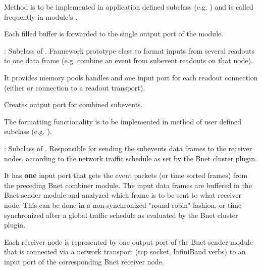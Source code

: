 \begin{description}
\begin{compactenum}
  \item Method  is to be implemented in application 
      defined subclass (e.g. ) and is called frequently 
      in module's . 
  \item Each filled buffer is forwarded to the single output port of the module. 
\end{compactenum}
\item[\class{bnet::CombinerModule}] :  
   Subclass of . 
   Framework prototype class to format inputs from several readouts to one data 
   frame (e.g. combine an event from subevent readouts on that node). 
\begin{compactenum}
  \item It provides memory pools handles and one input port for each 
      readout connection \\
      (either  or connection to a 
      readout transport). 
  \item Creates output port for combined subevents.    
  \item The formatting functionality is to be implemented in method 
       of user defined subclass (e.g. ).
\end{compactenum}
\item[\class{bnet::SenderModule}] : 
Subclass of . 
   Responsible for sending the subevents data frames to the receiver 
   nodes, according to the network traffic schedule as set by the Bnet cluster plugin.
\begin{compactenum}
  \item It has {\bf one} input port that gets the event packets 
      (or time sorted frames) from the preceding Bnet combiner module. 
      The input data frames are buffered in the Bnet sender module and analyzed 
      which frame is to be sent to what receiver node. 
      This can be done in a non-synchronized "round-robin" fashion, 
      or time-synchronized after a global traffic schedule as evaluated by 
      the Bnet cluster plugin.  
  \item Each receiver node is represented by one output port of 
      the Bnet sender module that is connected via a network transport 
      (tcp socket, InfiniBand verbs) to an input port of the 
      corresponding Bnet receiver node.
\end{compactenum}

\end{description}
